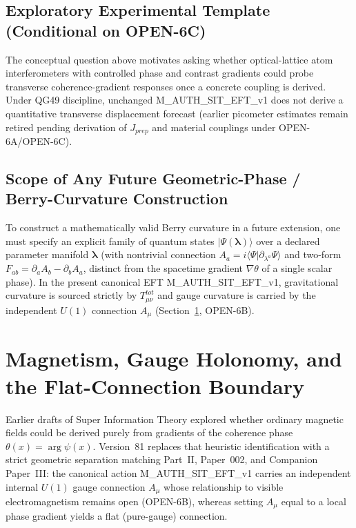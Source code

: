 \documentclass[american,11pt,letterpaper]{article}
\def\mathcal#1{#1}%
\def\mathrm#1{#1}%
\def\texttt#1{#1}%
\def\emph#1{#1}%
\begin{document}
\subsection{Exploratory Experimental Template (Conditional on \texttt{OPEN-6C})}

The conceptual question above motivates asking whether optical-lattice atom interferometers with controlled phase and contrast gradients could probe transverse coherence-gradient responses once a concrete coupling is derived. Under \texttt{QG49} discipline, unchanged \texttt{M\_AUTH\_SIT\_EFT\_v1} does \emph{not} derive a quantitative transverse displacement forecast (earlier picometer estimates remain retired pending derivation of $J_{\mathrm{prep}}$ and material couplings under \texttt{OPEN-6A}/\texttt{OPEN-6C}).

\subsection{Scope of Any Future Geometric-Phase / Berry-Curvature Construction}

To construct a mathematically valid Berry curvature in a future extension, one must specify an explicit family of quantum states $|\Psi(\boldsymbol{\lambda})\rangle$ over a declared parameter manifold $\boldsymbol{\lambda}$ (with nontrivial connection $\mathcal{A}_a = i\langle\Psi|\partial_{\lambda^a}\Psi\rangle$ and two-form $\mathcal{F}_{ab} = \partial_a\mathcal{A}_b - \partial_b\mathcal{A}_a$, distinct from the spacetime gradient $\nabla\theta$ of a single scalar phase). In the present canonical EFT \texttt{M\_AUTH\_SIT\_EFT\_v1}, gravitational curvature is sourced strictly by $T_{\mu\nu}^{\mathrm{tot}}$ and gauge curvature is carried by the independent $U(1)$ connection $A_\mu$ (Section~\ref{sec:magnetism-holonomy}, \texttt{OPEN-6B}).

\vspace{1cm}

\section{Magnetism, Gauge Holonomy, and the Flat-Connection Boundary}
\label{sec:magnetism-holonomy}
\label{sec:magnetism_as_holonomy}

Earlier drafts of Super Information Theory explored whether ordinary magnetic fields could be derived purely from gradients of the coherence phase $\theta(x) = \arg\psi(x)$. Version~81 replaces that heuristic identification with a strict geometric separation matching Part~II, Paper~002, and Companion Paper~III: the canonical action \texttt{M\_AUTH\_SIT\_EFT\_v1} carries an \emph{independent} internal $U(1)$ gauge connection $A_\mu$ whose relationship to visible electromagnetism remains open (\texttt{OPEN-6B}), whereas setting $A_\mu$ equal to a local phase gradient yields a flat (pure-gauge) connection.
\end{document}
